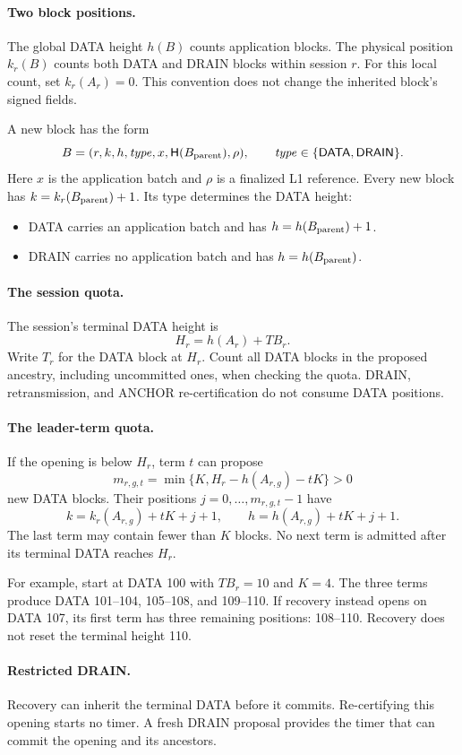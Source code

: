 \documentclass[11pt,a4paper]{article}
\newcommand{\Hash}{\mathsf H}
\newcommand{\tagg}[1]{\ensuremath{\mathsf{#1}}}
\begin{document}
\paragraph{Two block positions.}
The global DATA height $h(B)$ counts application blocks.
The physical position $k_r(B)$ counts both DATA and DRAIN blocks within
session $r$. For this local count, set $k_r(A_r)=0$.
This convention does not change the inherited block's signed fields.

A new block has the form
\[
 B=(r,k,h,\mathit{type},x,\Hash(B_{\rm parent}),\rho),
 \qquad \mathit{type}\in\{\tagg{DATA},\tagg{DRAIN}\}.
\]
Here $x$ is the application batch and $\rho$ is a finalized L1 reference.
Every new block has $k=k_r(B_{\rm parent})+1$.
Its type determines the DATA height:
\begin{itemize}
\item DATA carries an application batch and has $h=h(B_{\rm parent})+1$.
\item DRAIN carries no application batch and has $h=h(B_{\rm parent})$.
\end{itemize}

\paragraph{The session quota.}
The session's terminal DATA height is
\[
 H_r=h(A_r)+TB_r.
\]
Write $T_r$ for the DATA block at $H_r$.
Count all DATA blocks in the proposed ancestry, including uncommitted
ones, when checking the quota. DRAIN, retransmission, and ANCHOR
re-certification do not consume DATA positions.

\paragraph{The leader-term quota.}
If the opening is below $H_r$, term $t$ can propose
\[
 m_{r,g,t}=\min\{K,H_r-h(A_{r,g})-tK\}>0
\]
new DATA blocks. Their positions $j=0,\ldots,m_{r,g,t}-1$ have
\[
 k=k_r(A_{r,g})+tK+j+1,\qquad
 h=h(A_{r,g})+tK+j+1.
\]
The last term may contain fewer than $K$ blocks.
No next term is admitted after its terminal DATA reaches $H_r$.

For example, start at DATA 100 with $TB_r=10$ and $K=4$.
The three terms produce DATA 101--104, 105--108, and 109--110.
If recovery instead opens on DATA 107, its first term has three remaining
positions: 108--110. Recovery does not reset the terminal height 110.

\paragraph{Restricted DRAIN.}
\label{sec:drain}
Recovery can inherit the terminal DATA before it commits.
Re-certifying this opening starts no timer. A fresh DRAIN proposal
provides the timer that can commit the opening and its ancestors.
\end{document}
